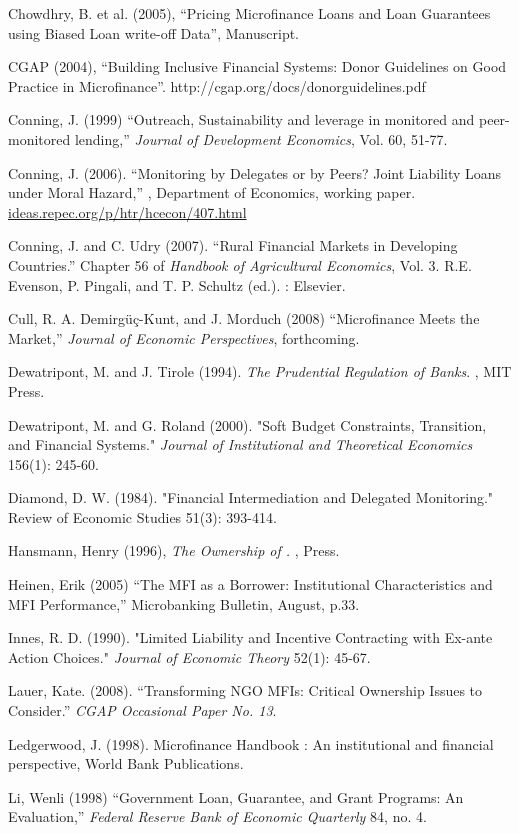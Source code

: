 \documentclass{article}
\begin{document}
Chowdhry, B. et al. (2005), ``Pricing Microfinance Loans and Loan
Guarantees using Biased Loan write-off Data'', Manuscript.

CGAP (2004), ``Building Inclusive Financial Systems: Donor Guidelines on
Good Practice in Microfinance''.
http://cgap.org/docs/donorguidelines.pdf

Conning, J. (1999) ``Outreach, Sustainability and leverage in monitored
and peer-monitored lending,'' \emph{Journal of Development Economics},
Vol. 60, 51-77.

Conning, J. (2006). ``Monitoring by Delegates or by Peers? Joint
Liability Loans under Moral Hazard,'' , Department of Economics, working
paper.
\href{http://ideas.repec.org/p/htr/hcecon/407.html}{ideas.repec.org/p/htr/hcecon/407.html}

Conning, J. and C. Udry (2007). ``Rural Financial Markets in Developing
Countries.'' Chapter 56 of \emph{Handbook of Agricultural Economics},
Vol. 3. R.E. Evenson, P. Pingali, and T. P. Schultz (ed.). : Elsevier.

Cull, R. A. Demirgüç-Kunt, and J. Morduch (2008) ``Microfinance Meets
the Market,'' \emph{Journal of Economic Perspectives}, forthcoming.

Dewatripont, M. and J. Tirole (1994). \emph{The Prudential Regulation of
Banks}. , MIT Press.

Dewatripont, M. and G. Roland (2000). "Soft Budget Constraints,
Transition, and Financial Systems." \emph{Journal of Institutional and
Theoretical Economics} 156(1): 245-60.

Diamond, D. W. (1984). "Financial Intermediation and Delegated
Monitoring." Review of Economic Studies 51(3): 393-414.

Hansmann, Henry (1996), \emph{The Ownership of .} , Press.

Heinen, Erik (2005) ``The MFI as a Borrower: Institutional
Characteristics and MFI Performance,'' Microbanking Bulletin, August,
p.33.

Innes, R. D. (1990). "Limited Liability and Incentive Contracting with
Ex-ante Action Choices." \emph{Journal of Economic Theory} 52(1): 45-67.

Lauer, Kate. (2008). ``Transforming NGO MFIs: Critical Ownership Issues
to Consider.'' \emph{CGAP Occasional Paper No. 13}.

Ledgerwood, J. (1998). Microfinance Handbook : An institutional and
financial perspective, World Bank Publications.

Li, Wenli (1998) ``Government Loan, Guarantee, and Grant Programs: An
Evaluation,'' \emph{Federal Reserve Bank of Economic Quarterly} 84, no.
4.
\end{document}
